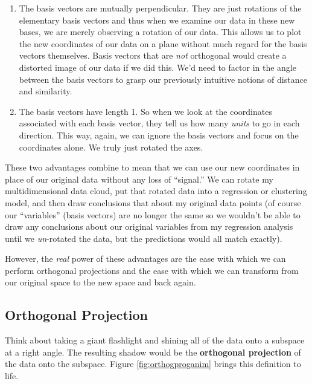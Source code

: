 \documentclass[
]{article}
\theoremstyle{definition}
\theoremstyle{definition}
\theoremstyle{definition}
\theoremstyle{definition}
\theoremstyle{remark}
\begin{document}
\begin{enumerate}
\def\labelenumi{\arabic{enumi}.}
\item
  The basis vectors are mutually perpendicular. They are just rotations of the elementary basis vectors and thus when we examine our data in these new bases, we are merely observing a rotation of our data. This allows us to plot the new coordinates of our data on a plane without much regard for the basis vectors themselves. Basis vectors that are \emph{not} orthogonal would create a distorted image of our data if we did this. We'd need to factor in the angle between the basis vectors to grasp our previously intuitive notions of distance and similarity.\\
\item
  The basis vectors have length 1. So when we look at the coordinates associated with each basis vector, they tell us how many \emph{units} to go in each direction. This way, again, we can ignore the basis vectors and focus on the coordinates alone. We truly just rotated the axes.
\end{enumerate}

These two advantages combine to mean that we can use our new coordinates in place of our original data without any loss of ``signal.'' We can rotate my multidimensional data cloud, put that rotated data into a regression or clustering model, and then draw conclusions that about my original data points (of course our ``variables'' (basis vectors) are no longer the same so we wouldn't be able to draw any conclusions about our original variables from my regression analysis until we \emph{un}-rotated the data, but the predictions would all match exactly).

However, the \emph{real} power of these advantages are the ease with which we can perform orthogonal projections and the ease with which we can transform from our original space to the new space and back again.

\hypertarget{orthogonal-projection}{%
\subsection{Orthogonal Projection}\label{orthogonal-projection}}

Think about taking a giant flashlight and shining all of the data onto a subspace at a right angle. The resulting shadow would be the \textbf{orthogonal projection} of the data onto the subspace. Figure \ref{fig:orthogproganim} brings this definition to life.
\end{document}
